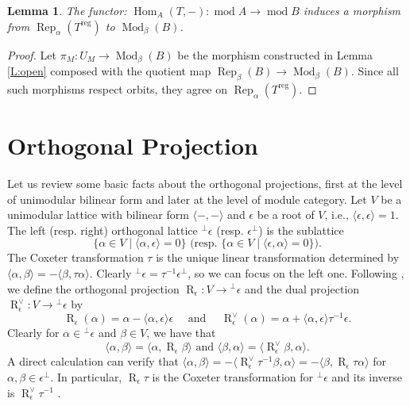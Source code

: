 \documentclass{amsart}
\newtheorem{lemma}[theorem]{Lemma}
\theoremstyle{definition}
\theoremstyle{remark}
\numberwithin{equation}{section}
\begin{document}
\begin{lemma} \label{L:morphism} The functor: ${\operatorname{Hom}}_A(T,-): {\operatorname{mod}} A\to {\operatorname{mod}} B$ induces a morphism from ${\operatorname{Rep}}_\alpha(T^{{\operatorname{reg}}})$ to ${\operatorname{Mod}}_\beta(B)$.
\end{lemma}

\begin{proof} Let $\pi_M: U_M\to {\operatorname{Mod}}_\beta(B)$ be the morphism constructed in Lemma \ref{L:open} composed with the quotient map ${\operatorname{Rep}}_\beta(B)\to {\operatorname{Mod}}_\beta(B)$.
Since all such morphisms respect orbits, they agree on ${\operatorname{Rep}}_\alpha(T^{{\operatorname{reg}}})$.
\end{proof}

\section{Orthogonal Projection} \label{S:OP}

Let us review some basic facts about the orthogonal projections, first at the level of unimodular bilinear form and later at the level of module category. Let $V$ be a unimodular lattice with bilinear form ${\langle{-,-}\rangle}$ and $\epsilon$ be a root of $V$, i.e., ${\langle{\epsilon,\epsilon}\rangle}=1$. The left (resp. right) orthogonal lattice $^\perp\epsilon$ (resp. $\epsilon^\perp$) is the sublattice
$$\{\alpha\in V\mid{\langle{\alpha,\epsilon}\rangle}=0\} \text{ (resp. }\{\alpha\in V\mid{\langle{\epsilon,\alpha}\rangle}=0\}).$$
The Coxeter transformation $\tau$ is the unique linear transformation determined by ${\langle{\alpha,\beta}\rangle}=-{\langle{\beta,\tau\alpha}\rangle}$. Clearly $^\perp \epsilon=\tau^{-1}\epsilon^\perp$, so we can focus on the left one. Following \cite{L}, we define the orthogonal projection ${\operatorname{R}}_\epsilon:V\to{{^\perp}\!}\epsilon$ and the dual projection ${\operatorname{R}}_\epsilon^\vee:V\to{{^\perp}\!}\epsilon$ by
$${\operatorname{R}}_\epsilon(\alpha)=\alpha-{\langle{\alpha,\epsilon}\rangle}\epsilon \quad\text{ and }\quad {\operatorname{R}}_\epsilon^\vee(\alpha)=\alpha+{\langle{\alpha,\epsilon}\rangle}\tau^{-1}\epsilon.$$
Clearly for $\alpha\in {{^\perp}\!}\epsilon$ and $\beta\in V$, we have that
$${\langle{\alpha,\beta}\rangle}={\langle{\alpha,{\operatorname{R}}_\epsilon\beta}\rangle} \text{ and } {\langle{\beta,\alpha}\rangle}={\langle{{\operatorname{R}}_\epsilon^\vee\beta,\alpha}\rangle}.$$
A direct calculation can verify that ${\langle{\alpha,\beta}\rangle}=-{\langle{{\operatorname{R}}_\epsilon^\vee\tau^{-1}\beta,\alpha}\rangle}=-{\langle{\beta,{\operatorname{R}}_\epsilon\tau\alpha}\rangle}$ for $\alpha,\beta\in\epsilon^\perp$. In particular, ${\operatorname{R}}_\epsilon\tau$ is the Coxeter transformation for ${{^\perp}\!} \epsilon$ and its inverse is ${\operatorname{R}}_\epsilon^\vee\tau^{-1}$ \cite[Corollary 18.1]{L}.
\end{document}
